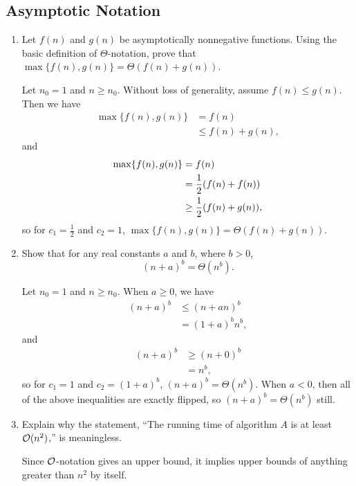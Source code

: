\documentclass[Chapter03]{subfiles}
\begin{document}
	\subsection{Asymptotic Notation}

	\begin{enumerate}
		\item Let $f(n)$ and $g(n)$ be asymptotically nonnegative functions. Using the basic definition of $\Theta$-notation, prove that $\max\{f(n), g(n)\} = \Theta(f(n) + g(n))$.
		\begin{answer}
			Let $n_0 = 1$ and $n \geq n_0$. Without loss of generality, assume $f(n) \leq g(n)$. Then we have
			\begin{align*}
				\max\{f(n), g(n)\} &= f(n)\\
					&\leq f(n) + g(n),
			\end{align*}
			and
			\begin{align*}
				\max\{f(n), g(n)\} &= f(n)\\
					&= \frac{1}{2}\qty(f(n) + f(n))\\
					&\geq \frac{1}{2}\qty(f(n) + g(n)),
			\end{align*}
			so for $c_1 = \frac{1}{2}$ and $c_2 = 1$, $\max\{f(n), g(n)\} = \Theta(f(n) + g(n))$.
		\end{answer}

		\item Show that for any real constants $a$ and $b$, where $b > 0$,
		\[
			(n + a)^b = \Theta(n^b).
		\]
		\begin{answer}
			Let $n_0 = 1$ and $n \geq n_0$. When $a \geq 0$, we have
			\begin{align*}
				(n + a)^b &\leq (n + an)^b\\
					&= (1 + a)^bn^b,
			\end{align*}
			and
			\begin{align*}
				(n + a)^b &\geq (n + 0)^b\\
					&= n^b,
			\end{align*}
			so for $c_1 = 1$ and $c_2 = (1 + a)^b$, $(n + a)^b = \Theta(n^b)$. When $a < 0$, then all of the above inequalities are exactly flipped, so $(n + a)^b = \Theta(n^b)$ still.
		\end{answer}

		\item Explain why the statement, ``The running time of algorithm $A$ is at least $\mathcal{O}(n^2)$,'' is meaningless.
		\begin{answer}
			Since $\mathcal{O}$-notation gives an upper bound, it implies upper bounds of anything greater than $n^2$ by itself.
		\end{answer}


\end{enumerate}
\end{document}

